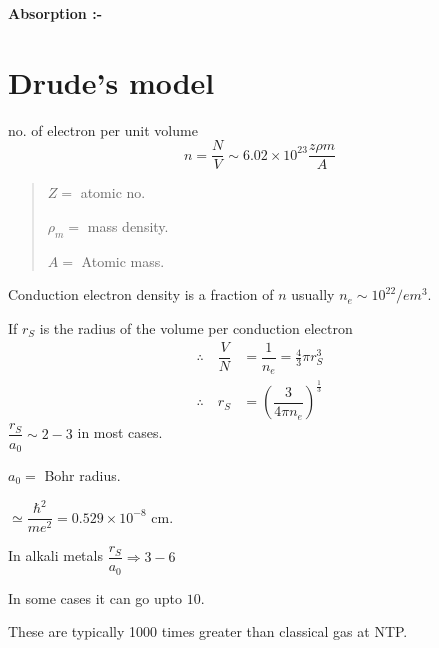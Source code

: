 \noindent
{\bf Absorption :-}

\section*{Drude's model}

no. of electron per unit volume
$$
n=\dfrac{N}{V}\sim 6.02\times 10^{23}\dfrac{z\rho m}{A}
$$
\begin{quote}
$Z=$ atomic no.

$\rho_{m}=$ mass density.

$A=$ Atomic mass.
\end{quote}

Conduction electron density is a fraction of $n$ usually $n_{e}\sim 10^{22}/em^{3}$.

If $r_{S}$ is the radius of the volume per conduction electron
\begin{align*}
\therefore\quad \dfrac{V}{N} &=\dfrac{1}{n_{e}}=\frac{4}{3}\pi r^{3}_{S}\\
\therefore\quad r_{S} &= \left(\dfrac{3}{4\pi n_{e}}\right)^{\frac{1}{3}}
\end{align*}
$\dfrac{r_{S}}{a_{0}}\sim 2-3$ in most cases.

$a_{0}=$ Bohr radius.

$\simeq \dfrac{\hbar^{2}}{me^{2}}=0.529\times 10^{-8}$ cm.

In alkali metals $\dfrac{r_{S}}{a_{0}}\Rightarrow 3-6$

In some cases it can go upto $10$.

These are typically 1000 times greater than classical gas at NTP.

